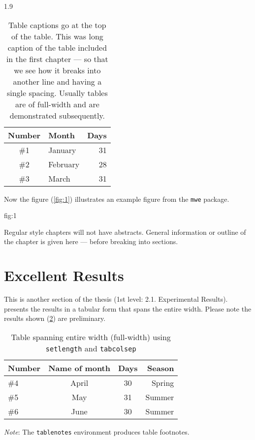 \documentclass[ms-thesis,12pt,mathdesign]{ndsu-thesis-2022}
\newcommand\myspacing{1.9} %
\begin{document}
\begin{spacing}{\myspacing}
\begin{table}[h]
\centering
\caption{Table captions go at the top of the table. This was long caption of the table
included in the first chapter --- so that we see how it breaks into another line and
having a single spacing. Usually tables are of full-width and are demonstrated subsequently.}
\vspace{-1ex}
\begin{tabular}{clr}
\toprule
Number & Month & Days\\
\midrule
\#1 & January    & 31\\
\#2 & February   & 28\\
\#3 & March      & 31\\
\bottomrule
\end{tabular}
\label{tab:1}
\end{table}	\kant[7]

Now the figure (\cref{fig:1}) illustrates an example figure from the \texttt{mwe} package.

{fig:1}	\kant[8-9]


Regular style chapters will not have abstracts. General information or outline of the
chapter is given here --- before breaking into sections.

\section{Excellent Results}
This is another section of the thesis (1st level: 2.1. Experimental Results).
 presents the results in a tabular form that spans the entire width.
Please note the results shown (\cref{tab:2}) are preliminary.

\begin{table}[ht]
\centering
\caption{Table spanning entire width (full-width) using \texttt{setlength} and
\texttt{tabcolsep}}
\vspace{-1ex}
\setlength{\tabcolsep}{3.75em}
\begin{tabular}{@{\hspace{2ex}} lccr @{\hspace{2ex}}}
\toprule
Number & Name of month & Days & Season\\
\midrule
\#4 	& April  & 30		& Spring\\
\#5 	& May    & 31		& Summer\\
\#6 	& June   & 30		& Summer\\
\bottomrule
\end{tabular}
\begin{tablenotes}[flushleft]
\footnotesize
\item \hspace{-1ex} \emph{Note}: The \texttt{tablenotes} environment produces table footnotes. 
\end{tablenotes}
\label{tab:2}
\end{table}	\kant[7-8]


\end{spacing}
\end{document}
